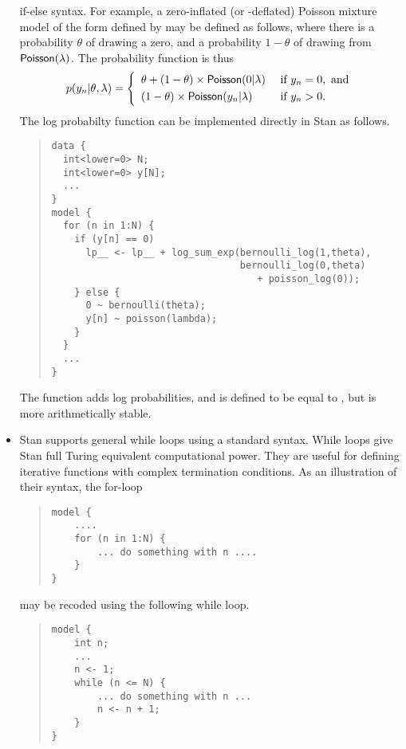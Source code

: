 \begin{itemize}
  if-else syntax.  For example, a zero-inflated (or -deflated) Poisson
  mixture model of the form defined by \citet{Lambert:1992} 
  may be defined as follows, where there is a probability $\theta$ of
  drawing a zero, and a probability $1 - \theta$ of drawing from
  $\mbox{\sf Poisson}(\lambda)$.  The probability function is thus
\[
p(y_n|\theta,\lambda) 
= 
\left\{
\begin{array}{ll}
\theta + (1 - \theta) \times \mbox{\sf Poisson}(0|\lambda) & \mbox{ if } y_n = 0, \mbox{ and}
\\[3pt]
(1-\theta) \times \mbox{\sf Poisson}(y_n|\lambda) & \mbox{ if } y_n > 0.
\end{array}
\right.
\] 
%
The log probabilty function can be implemented directly in Stan as follows.
%
\begin{quote}
\begin{Verbatim}
data {
  int<lower=0> N;
  int<lower=0> y[N];
  ...
}
model {
  for (n in 1:N) {
    if (y[n] == 0)
      lp__ <- lp__ + log_sum_exp(bernoulli_log(1,theta),
                                 bernoulli_log(0,theta) 
                                    + poisson_log(0));
    } else {
      0 ~ bernoulli(theta);
      y[n] ~ poisson(lambda);
    }
  }
  ...
}
\end{Verbatim}
\end{quote}
%
The  function adds log probabilities, and
is defined to be equal to , but is more
arithmetically stable. 
%
\item Stan supports general while loops using a standard syntax.  
While loops give Stan full Turing equivalent computational power.
They are useful for defining iterative functions with complex
termination conditions.  As an illustration of their syntax,
the for-loop
%
\begin{quote}
\begin{Verbatim}
model {
    ....
    for (n in 1:N) {
        ... do something with n ....
    }
}
\end{Verbatim}
\end{quote}
%
may be recoded using the following while loop.
%
\begin{quote}
\begin{Verbatim}
model {
    int n;
    ...
    n <- 1;
    while (n <= N) {
        ... do something with n ...
        n <- n + 1;
    }
}
\end{Verbatim}
\end{quote}
%


\end{itemize}


